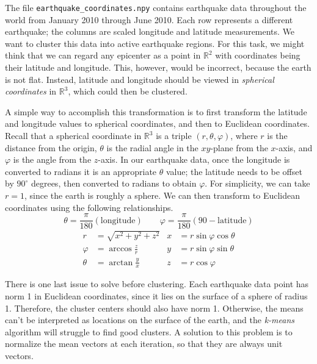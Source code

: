 The file \texttt{earthquake\_coordinates.npy} contains earthquake data throughout the world from January 2010 through June 2010.
Each row represents a different earthquake; the columns are scaled longitude and latitude measurements.
We want to cluster this data into active earthquake regions.
For this task, we might think that we can regard any epicenter as a point in $\mathbb{R}^{2}$ with coordinates being their latitude and longitude.
This, however, would be incorrect, because the earth is not flat.
Instead, latitude and longitude should be viewed in \emph{spherical coordinates} in $\mathbb{R}^{3}$, which could then be clustered.

A simple way to accomplish this transformation is to first transform the latitude and longitude values to spherical coordinates, and then to Euclidean coordinates.
Recall that a spherical coordinate in $\mathbb{R}^3$ is a triple $(r,\theta,\varphi)$, where $r$ is the distance from the origin, $\theta$ is the radial angle in the $xy$-plane from the $x$-axis, and $\varphi$ is the angle from the $z$-axis.
In our earthquake data, once the longitude is converted to radians it is an appropriate $\theta$ value; the latitude needs to be offset by $90^\circ$ degrees, then converted to radians to obtain $\varphi$.
For simplicity, we can take $r=1$, since the earth is roughly a sphere.
We can then transform to Euclidean coordinates using the following relationships.
\[
\theta = \frac{\pi}{180}\left(\text{longitude}\right)
\qquad
\varphi = \frac{\pi}{180}\left(90 - \text{latitude}\right)
\]
\begin{align*}
r & = \sqrt{x^{2} + y^{2} + z^{2}} & x & = r \sin \varphi \cos \theta \\
\varphi & = \arccos \frac{z}{r} & y & = r \sin \varphi \sin \theta \\
\theta & = \arctan \frac{y}{x} & z & = r \cos \varphi
\end{align*}

There is one last issue to solve before clustering.
Each earthquake data point has norm 1 in Euclidean coordinates, since it lies on the surface of a sphere of radius 1.
Therefore, the cluster centers should also have norm 1.
Otherwise, the means can't be interpreted as locations on the surface of the earth, and the \emph{k-means} algorithm will struggle to find good clusters.
A solution to this problem is to normalize the mean vectors at each iteration, so that they are always unit vectors.

